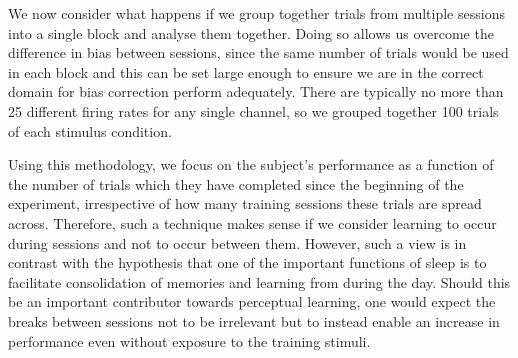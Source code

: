We now consider what happens if we group together trials from multiple sessions into a single block and analyse them together.
Doing so allows us overcome the difference in bias between sessions, since the same number of trials would be used in each block and this can be set large enough to ensure we are in the correct domain for bias correction perform adequately.
There are typically no more than \num{25} different firing rates for any single channel, so we grouped together \num{100} trials of each stimulus condition.

Using this methodology, we focus on the subject's performance as a function of the number of trials which they have completed since the beginning of the experiment, irrespective of how many training sessions these trials are spread across.
Therefore, such a technique makes sense if we consider learning to occur during sessions and not to occur between them.
However, such a view is in contrast with the hypothesis that one of the important functions of sleep is to facilitate consolidation of memories and learning from during the day.
Should this be an important contributor towards perceptual learning, one would expect the breaks between sessions not to be irrelevant but to instead enable an increase in performance even without exposure to the training stimuli.


